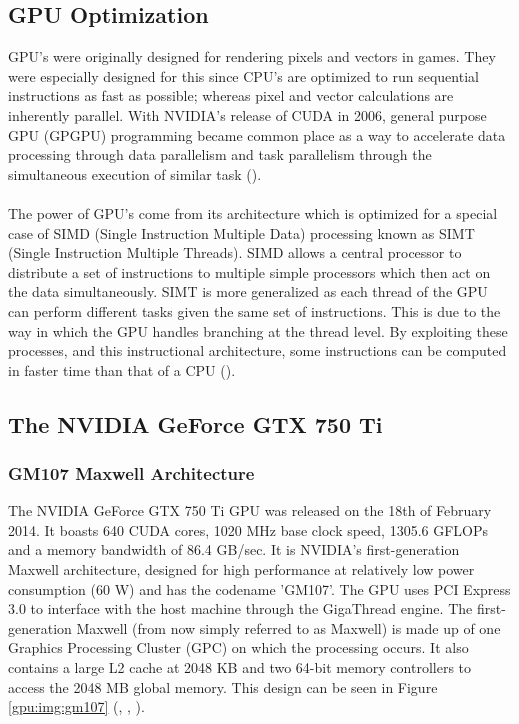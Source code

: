 \subsection{GPU Optimization}\label{gpu:sec:opt}
GPU's were originally designed for rendering pixels and vectors in games. They were especially designed for this since CPU's are optimized to run sequential instructions as fast as possible; whereas pixel and vector calculations are inherently parallel. With NVIDIA's release of CUDA in 2006, general purpose GPU (GPGPU) programming became common place as a way to accelerate data processing through data parallelism and task parallelism through the simultaneous execution of similar task (\cite{nvidia_cuda}).
\\
\\
The power of GPU's come from its architecture which is optimized for a special case of SIMD (Single Instruction Multiple Data) processing known as SIMT (Single Instruction Multiple Threads). SIMD allows a central processor to distribute a set of instructions to multiple simple processors which then act on the data simultaneously. SIMT is more generalized as each thread of the GPU can perform different tasks given the same set of instructions. This is due to the way in which the GPU handles branching at the thread level. By exploiting these processes, and this instructional architecture, some instructions can be computed in faster time than that of a CPU (\cite{vuduc2013brief}).
\subsection{The NVIDIA GeForce GTX 750 Ti}\label{gpu:sec:750}
%
\subsubsection{GM107 Maxwell Architecture}\label{gpu:ssec:max}
The NVIDIA GeForce GTX 750 Ti GPU was released on the 18th of February 2014. It boasts 640 CUDA cores, 1020 MHz base clock speed, 1305.6 GFLOPs and a memory bandwidth of 86.4 GB/sec. It is NVIDIA's first-generation Maxwell architecture, designed for high performance at relatively low power consumption (60 W) and has the codename 'GM107'. The GPU uses PCI Express 3.0 to interface with the host machine through the GigaThread engine. The first-generation Maxwell (from now simply referred to as Maxwell) is made up of one Graphics Processing Cluster (GPC) on which the processing occurs. It also contains a large L2 cache at 2048 KB and two 64-bit memory controllers to access the 2048 MB global memory. This design can be seen in Figure \ref{gpu:img:gm107} (\cite{geforce_750}, \cite{g750_specs}, \cite{g750_paper}).
%
